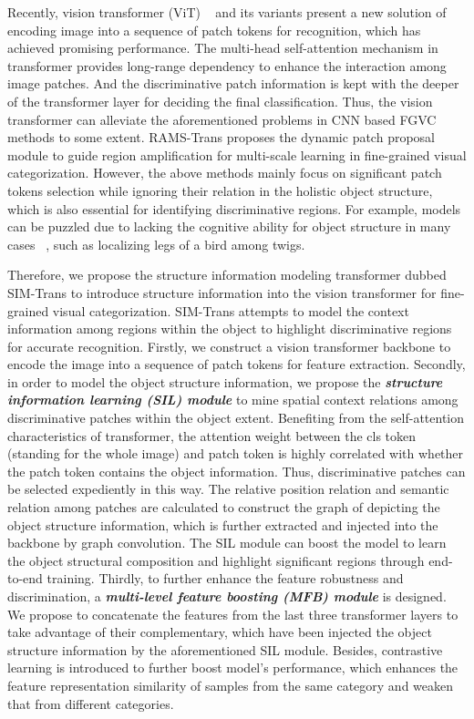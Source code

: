 \documentclass[sigconf, nonacm]{acmart}
\begin{document}
Recently, vision transformer (ViT) ~\cite{dosovitskiy2020image} and its variants present a new solution of encoding image into a sequence of patch tokens for recognition, which has achieved promising performance. The multi-head self-attention mechanism in transformer provides long-range dependency to enhance the interaction among image patches. And the discriminative patch information is kept with the deeper of the transformer layer for deciding the final classification. Thus, the vision transformer can alleviate the aforementioned problems in CNN based FGVC methods to some extent. RAMS-Trans \cite{hu2021rams} proposes the dynamic patch proposal module to guide region amplification for multi-scale learning in fine-grained visual categorization. However, the above methods mainly focus on significant patch tokens selection while ignoring their relation in the holistic object structure, which is also essential for identifying discriminative regions. For example, models can be puzzled due to lacking the cognitive ability for object structure in many cases ~\cite{zhou2020look}, such as localizing legs of a bird among twigs.

Therefore, we propose the structure information modeling transformer dubbed SIM-Trans to introduce structure information into the vision transformer for fine-grained visual categorization. SIM-Trans attempts to model the context information among regions within the object to highlight discriminative regions for accurate recognition. Firstly, we construct a vision transformer backbone to encode the image into a sequence of patch tokens for feature extraction. Secondly, in order to model the object structure information, we propose the \textbf{\emph{structure information learning (SIL) module}} to mine spatial context relations among discriminative patches within the object extent. Benefiting from the self-attention characteristics of transformer, the attention weight between the cls token (standing for the whole image) and patch token is highly correlated with whether the patch token contains the object information. Thus, discriminative patches can be selected expediently in this way. The relative position relation and semantic relation among patches are calculated to construct the graph of depicting the object structure information, which is further extracted and injected into the backbone by graph convolution. The SIL module can boost the model to learn the object structural composition and highlight significant regions through end-to-end training. Thirdly, to further enhance the feature robustness and discrimination, a \textbf{\emph{multi-level feature boosting (MFB) module}} is designed. We propose to concatenate the features from the last three transformer layers to take advantage of their complementary, which have been injected the object structure information by the aforementioned SIL module. Besides, contrastive learning is introduced to further boost model’s performance, which enhances the feature representation similarity of samples from the same category and weaken that from different categories.
\end{document}
